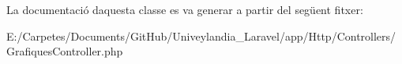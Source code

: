 La documentació d\textquotesingle{}aquesta classe es va generar a partir del següent fitxer\+:\begin{DoxyCompactItemize}
\item 
E\+:/\+Carpetes/\+Documents/\+Git\+Hub/\+Univeylandia\+\_\+\+Laravel/app/\+Http/\+Controllers/Grafiques\+Controller.\+php\end{DoxyCompactItemize}
